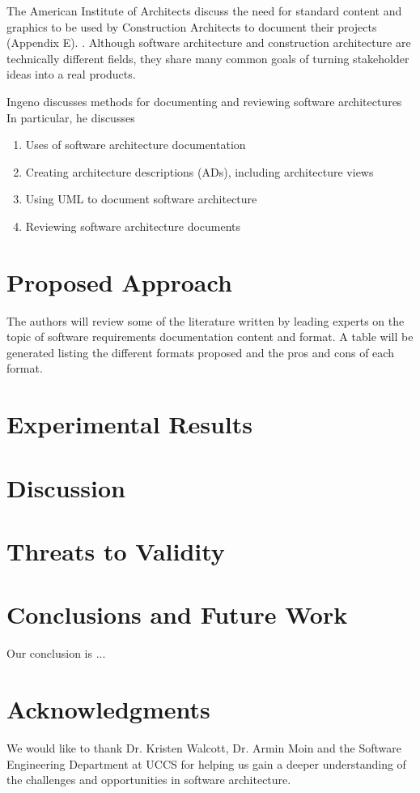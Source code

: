 \documentclass{acm_proc_article-sp}
\begin{document}
The American Institute of Architects discuss the need for standard content and graphics to be used by Construction Architects to document their projects (Appendix E). \cite{Lamport:AIA_Graphical_Standards}. Although software architecture and construction architecture are technically different fields, they share many common goals of turning stakeholder ideas into a real products.

Ingeno discusses methods for documenting and reviewing software architectures \cite{Lamport:SoftwareArchitectureHandbook} In particular, he discusses
\begin{enumerate}
	\item Uses of software architecture documentation
	\item Creating architecture descriptions (ADs), including architecture views
	\item Using UML to document software architecture
	\item Reviewing software architecture documents
\end{enumerate}

\section{Proposed Approach}
The authors will review some of the literature written by leading experts on the topic of software requirements documentation content and format. A table will be generated listing the different formats proposed and the pros and cons of each format.

\section{Experimental Results}

\section{Discussion}

\section{Threats to Validity}

\section{Conclusions and Future Work}
Our conclusion is ...

\section{Acknowledgments}
We would like to thank Dr. Kristen Walcott, Dr. Armin Moin and the Software Engineering Department at UCCS for helping us gain a deeper understanding of the challenges and opportunities in software architecture.
\end{document}
